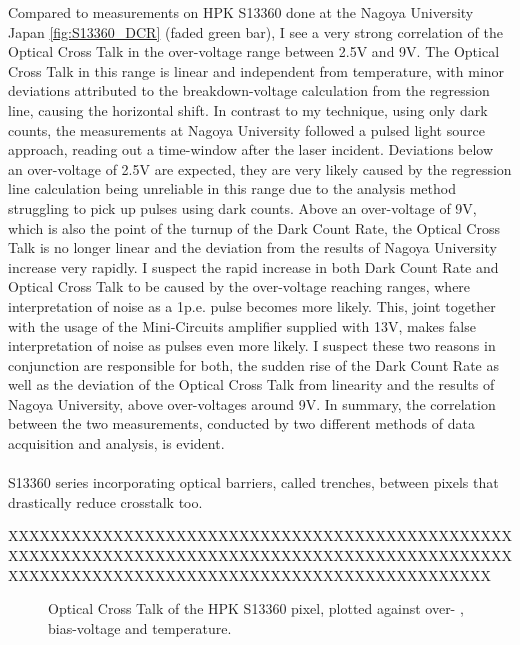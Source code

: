 \documentclass[article,type=msc,colorback,accentcolor=tud9c]{tudthesis}
\begin{document}
Compared to measurements on HPK S13360 done at the Nagoya University Japan \ref{fig:S13360_DCR} (faded green bar), I see a very strong correlation of the Optical Cross Talk in the over-voltage range between 2.5V and 9V. The Optical Cross Talk in this range is linear and independent from temperature, with minor deviations attributed to the breakdown-voltage calculation from the regression line, causing the horizontal shift. In contrast to my technique, using only dark counts, the measurements at Nagoya University followed a pulsed light source approach, reading out a time-window after the laser incident. Deviations below an over-voltage of 2.5V are expected, they are very likely caused by the regression line calculation being unreliable in this range due to the analysis method struggling to pick up pulses using dark counts. Above an over-voltage of 9V, which is also the point of the turnup of the Dark Count Rate, the Optical Cross Talk is no longer linear and the deviation from the results of Nagoya University increase very rapidly. I suspect the rapid increase in both Dark Count Rate and Optical Cross Talk to be caused by the over-voltage reaching ranges, where interpretation of noise as a 1p.e. pulse becomes more likely. This, joint together with the usage of the Mini-Circuits amplifier supplied with 13V, makes false interpretation of noise as pulses even more likely. I suspect these two reasons in conjunction are responsible for both, the sudden rise of the Dark Count Rate as well as the deviation of the Optical Cross Talk from linearity and the results of Nagoya University, above over-voltages around 9V. In summary, the correlation between the two measurements, conducted by two different methods of data acquisition and analysis, is evident.\\\\

S13360 series incorporating optical barriers, called trenches, between pixels that drastically reduce crosstalk too.

XXXXXXXXXXXXXXXXXXXXXXXXXXXXXXXXXXXXXXXXXXXXXXXXXXXXXXXXXXXXXXXXXXXXXXXXXXXXXXXXXXXXXXXXXXXXXXXXXXXXXXXXXXXXXXXXXXXXXXXXXXXXXXXXXXXXXXXXXXXXXX

\begin{figure}[h]
\begin{centering}
\caption{Optical Cross Talk of the HPK S13360 pixel, plotted against over- , bias-voltage and temperature. }
\label{fig:S13360_OCT}
\end{centering}
\end{figure}
\end{document}
